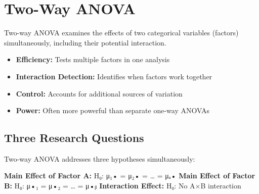 \documentclass[
  11pt,
  letterpaper,
  oneside]{book}
\providecommand{\tightlist}{%
  \setlength{\itemsep}{0pt}\setlength{\parskip}{0pt}}\usepackage{longtable,booktabs,array}
\begin{document}
\section{Two-Way ANOVA}\label{two-way-anova}

Two-way ANOVA examines the effects of two categorical variables
(factors) simultaneously, including their potential interaction.

\begin{tcolorbox}[enhanced jigsaw, left=2mm, opacityback=0, titlerule=0mm, leftrule=.75mm, colbacktitle=quarto-callout-note-color!10!white, title=\textcolor{quarto-callout-note-color}{\faInfo}\hspace{0.5em}{Advantages of Two-Way ANOVA}, breakable, opacitybacktitle=0.6, rightrule=.15mm, colframe=quarto-callout-note-color-frame, toprule=.15mm, bottomrule=.15mm, bottomtitle=1mm, toptitle=1mm, coltitle=black, arc=.35mm, colback=white]

\begin{itemize}
\tightlist
\item
  \textbf{Efficiency:} Tests multiple factors in one analysis
\item
  \textbf{Interaction Detection:} Identifies when factors work together
\item
  \textbf{Control:} Accounts for additional sources of variation
\item
  \textbf{Power:} Often more powerful than separate one-way ANOVAs
\end{itemize}

\end{tcolorbox}

\subsection{Three Research Questions}\label{three-research-questions}

Two-way ANOVA addresses three hypotheses simultaneously:

\textbf{Main Effect of Factor A:} H₀: μ₁• = μ₂• = \ldots{} = μₐ•
\textbf{Main Effect of Factor B:} H₀: μ•₁ = μ•₂ = \ldots{} = μ•ᵦ
\textbf{Interaction Effect:} H₀: No A×B interaction
\end{document}
